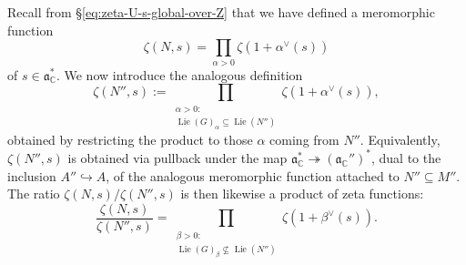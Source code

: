 \documentclass[reqno]{amsart}
\DeclareMathOperator{\Lie}{Lie}
\theoremstyle{plain} \newtheorem{theorem} {Theorem}
\theoremstyle{definition} \newtheorem{definition} [theorem] {Definition}
\theoremstyle{itplain} %
\numberwithin{equation}{section}
\numberwithin{theorem}{section}
\begin{document}
Recall from \S\ref{eq:zeta-U-s-global-over-Z} that we have defined a meromorphic function
\begin{equation*}
\zeta(N,s) = \prod_{\alpha > 0} \zeta(1 + \alpha^\vee(s))
\end{equation*}
of $s \in \mathfrak{a}_{\mathbb{C}}^*$.  We now introduce the analogous definition
\begin{equation*}
  \zeta(N'',s) := \prod_{
    \substack{
      \alpha > 0 :  \\
       \Lie(G)_\alpha \subseteq \Lie(N'')
    }
  }
  \zeta(1 + \alpha^\vee(s)),
\end{equation*}
obtained by restricting the product to those $\alpha$ coming from $N''$.  Equivalently, $\zeta(N'',s)$ is obtained via pullback under the map $\mathfrak{a}_{\mathbb{C}}^* \twoheadrightarrow (\mathfrak{a}_{\mathbb{C} }'')^*$, dual to the inclusion $A'' \hookrightarrow A$, of the analogous meromorphic function attached to $N'' \subseteq M''$.  The ratio $\zeta(N,s) / \zeta(N'', s)$ is then likewise a product of zeta functions:
\begin{equation*}
  \frac{\zeta (N, s)}{ \zeta (N'', s)}
  = \prod _{
    \substack{
      \beta > 0:   \\
      \Lie(G)_\beta \not\subseteq \Lie(N'')
    }
  }
  \zeta(1 + \beta^\vee(s)).
\end{equation*}
\end{document}
